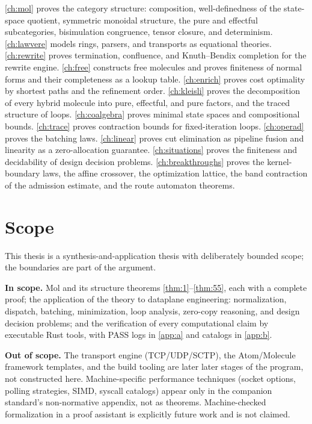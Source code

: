 \autoref{ch:mol} proves the category structure: composition,
well-definedness of the state-space quotient, symmetric monoidal
structure, the pure and effectful subcategories, bisimulation
congruence, tensor closure, and determinism. \autoref{ch:lawvere}
models rings, parsers, and transports as equational theories.
\autoref{ch:rewrite} proves termination, confluence, and Knuth--Bendix
completion for the rewrite engine. \autoref{ch:free} constructs free
molecules and proves finiteness of normal forms and their completeness
as a lookup table. \autoref{ch:enrich} proves cost optimality by
shortest paths and the refinement order. \autoref{ch:kleisli} proves
the decomposition of every hybrid molecule into pure, effectful, and
pure factors, and the traced structure of loops. \autoref{ch:coalgebra}
proves minimal state spaces and compositional bounds. \autoref{ch:trace}
proves contraction bounds for fixed-iteration loops. \autoref{ch:operad}
proves the batching laws. \autoref{ch:linear} proves cut elimination as
pipeline fusion and linearity as a zero-allocation guarantee.
\autoref{ch:situations} proves the finiteness and decidability of
design decision problems. \autoref{ch:breakthroughs} proves the
kernel-boundary laws, the affine crossover, the optimization lattice,
the band contraction of the admission estimate, and the route
automaton theorems.
\section{Scope}
\label{sec:scope}

This thesis is a synthesis-and-application thesis with deliberately bounded scope; the boundaries are part of the argument.

\textbf{In scope.} Mol and its structure theorems \autoref{thm:1}--\autoref{thm:55}, each with a complete proof; the application of the theory to dataplane engineering: normalization, dispatch, batching, minimization, loop analysis, zero-copy reasoning, and design decision problems; and the verification of every computational claim by executable Rust tools, with PASS logs in \autoref{app:a} and catalogs in \autoref{app:b}.

\textbf{Out of scope.} The transport engine (TCP/UDP/SCTP), the Atom/Molecule framework templates, and the build tooling are later later stages of the program, not constructed here. Machine-specific performance techniques (socket options, polling strategies, SIMD, syscall catalogs) appear only in the companion standard's non-normative appendix, not as theorems. Machine-checked formalization in a proof assistant is explicitly future work and is not claimed.

